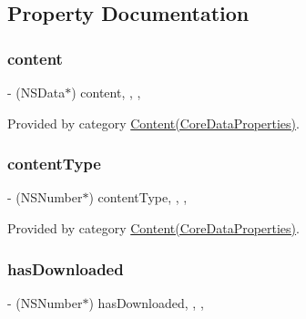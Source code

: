 \subsection{Property Documentation}
\hypertarget{interface_content_afc95ad6eb444142762764776c7167ce0}{}\label{interface_content_afc95ad6eb444142762764776c7167ce0} 
\subsubsection{\texorpdfstring{content}{content}}
{\footnotesize\ttfamily -\/ (N\+S\+Data$\ast$) content\hspace{0.3cm}{\ttfamily [read]}, {\ttfamily [write]}, {\ttfamily [nonatomic]}, {\ttfamily [retain]}}



Provided by category \hyperlink{category_content_07_core_data_properties_08_afc95ad6eb444142762764776c7167ce0}{Content(\+Core\+Data\+Properties)}.

\hypertarget{interface_content_ab4dabc1aa27718c616787748076ab10b}{}\label{interface_content_ab4dabc1aa27718c616787748076ab10b} 
\subsubsection{\texorpdfstring{content\+Type}{contentType}}
{\footnotesize\ttfamily -\/ (N\+S\+Number$\ast$) content\+Type\hspace{0.3cm}{\ttfamily [read]}, {\ttfamily [write]}, {\ttfamily [nonatomic]}, {\ttfamily [retain]}}



Provided by category \hyperlink{category_content_07_core_data_properties_08_ab4dabc1aa27718c616787748076ab10b}{Content(\+Core\+Data\+Properties)}.

\hypertarget{interface_content_a2889370c08c2aa08de72518277c7a72f}{}\label{interface_content_a2889370c08c2aa08de72518277c7a72f} 
\subsubsection{\texorpdfstring{has\+Downloaded}{hasDownloaded}}
{\footnotesize\ttfamily -\/ (N\+S\+Number$\ast$) has\+Downloaded\hspace{0.3cm}{\ttfamily [read]}, {\ttfamily [write]}, {\ttfamily [nonatomic]}, {\ttfamily [retain]}}



